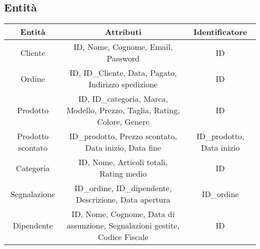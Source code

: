 \subsection{Entità}
\begin{center}
\begin{tabular}{ |c|c|c|} 
\hline
Entità & Attributi & Identificatore \\
\hline
\multirow{4}{8em}{Cliente} & \multirow{4}{12em}{ID, Nome, Cognome, Email, Password} & \multirow{4}{9em}{ID} \\
 &  & \\
 &  & \\
 &  & \\
\hline

\multirow{4}{8em}{Ordine} & \multirow{4}{12em}{ID, ID\_Cliente, Data, Pagato, Indirizzo spedizione} & \multirow{4}{9em}{ID} \\
 &  & \\
 &  & \\
 &  & \\
\hline

\multirow{5}{8em}{Prodotto} & \multirow{5}{12em}{ID, ID\_categoria, Marca, Modello, Prezzo, Taglia, Rating, Colore, Genere} & \multirow{5}{9em}{ID} \\
 &  & \\
 &  & \\
 &  & \\
 &  & \\
\hline

\multirow{4}{8em}{Prodotto scontato} & \multirow{4}{12em}{ID\_prodotto, Prezzo scontato, Data inizio, Data fine} & \multirow{4}{9em}{ID\_prodotto, Data inizio} \\
 &  & \\
 &  & \\
 &  & \\
\hline

\multirow{3}{8em}{Categoria} & \multirow{3}{12em}{ID, Nome, Articoli totali, Rating medio} & \multirow{3}{9em}{ID} \\
 &  & \\
 &  & \\ 
\hline

\multirow{5}{8em}{Segnalazione} & \multirow{5}{12em}{ ID\_ordine, ID\_dipendente, Descrizione, Data apertura} & \multirow{5}{9em}{ID\_ordine} \\
 &  & \\
 &  & \\
 &  & \\
 &  & \\
\hline

\multirow{6}{8em}{Dipendente} & \multirow{6}{12em}{ID, Nome, Cognome, Data di assunzione, Segnalazioni gestite, Codice Fiscale} & \multirow{6}{9em}{ID} \\
&  & \\
&  & \\
&  & \\
&  & \\
&  & \\
\hline
\end{tabular}
\end{center}
